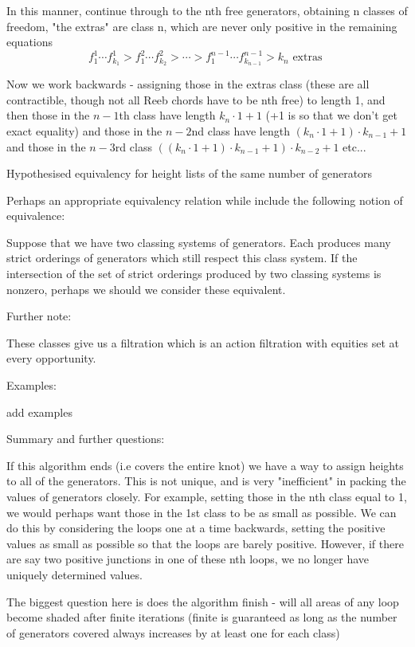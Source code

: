 \documentclass[11pt]{amsart}
\begin{document}
In this manner, continue through to the nth free generators, obtaining n classes of freedom, "the extras" are class n, which are never only positive in the remaining equations
\[f^{1}_1 \cdots f^{1}_{k_1} > f^{2}_1 \cdots f^{2}_{k_2}> \cdots > f^{n-1}_1 \cdots f^{n-1}_{k_{n-1}} > k_n \text{ extras }\]

Now we work backwards - assigning those in the extras class (these are all contractible, though not all Reeb chords have to be nth free) to length 1, and then those in the $n-1$th class have length $k_n \cdot 1 + 1$ (+1 is so that we don't get exact equality) and those in the $n-2$nd class have length $ (k_n \cdot 1 + 1)\cdot k_{n-1} + 1$ and those in the $n-3$rd class $ ((k_n \cdot 1 + 1)\cdot k_{n-1} + 1)\cdot k_{n-2} + 1$ etc...




Hypothesised equivalency for height lists of the same number of generators

Perhaps an appropriate equivalency relation while include the following notion of equivalence:

Suppose that we have two classing systems of generators. Each produces many strict orderings of generators which still respect this class system. If the intersection of the set of strict orderings produced by two classing systems is nonzero, perhaps we should we consider these equivalent.




Further note:

These classes give us a filtration which is an action filtration with equities set at every opportunity. 

Examples:

add examples

Summary and further questions:

If this algorithm ends (i.e covers the entire knot) we have a way to assign heights to all of the generators. This is not unique, and is very "inefficient" in packing the values of generators closely. For example, setting those in the nth class equal to 1, we would perhaps want those in the 1st class to be as small as possible. We can do this by considering the loops one at a time backwards, setting the positive values as small as possible so that the loops are barely positive. However, if there are say two positive junctions in one of these nth loops, we no longer have uniquely determined values. 

The biggest question here is does the algorithm finish - will all areas of any loop become shaded after finite iterations (finite is guaranteed as long as the number of generators covered always increases by at least one for each class)
\end{document}
